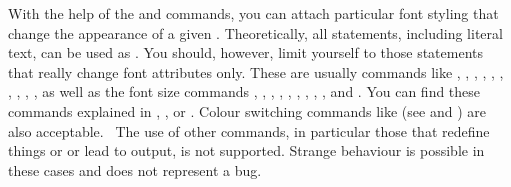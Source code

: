 \begin{Declaration}
\end{Declaration}%
With%
 the help of the  and  commands,
you can attach particular font styling  that change the
appearance of a given . Theoretically, all statements,
including literal text, can be used as . You
should, however, limit yourself to those statements that
really change font attributes only. These are usually commands like
, , , ,
, , , ,
, , as well as the font size commands
, , , , ,
, , , ,
and . You can find these commands explained in \cite{lshort},
\cite{latex:usrguide-historic}, or \cite{latex:fntguide}. Colour switching
commands like  (see \cite{package:graphics} and
\cite{package:xcolor}) are also acceptable.%
\iffalse %
  \ The behaviour when using other commands, especially those that lead to
  redefinitions or generate output, is undefined. Strange behaviour is
  possible and does not represent a bug.  \else \ The use of other commands,
  in particular those that redefine things or or lead to output, is not
  supported. Strange behaviour is possible in these cases and does not
  represent a bug.  \fi

